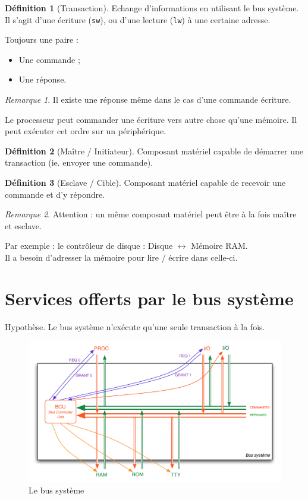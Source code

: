 \documentclass[11pt,english,french]{scrreprt}
\theoremstyle{remark}
\newtheorem*{rem*}{Remarque}
\theoremstyle{definition}
\newtheorem*{def*}{Définition}
\begin{document}
\begin{def*}[Transaction]
	Echange d'informations en utilisant le bus système. Il s'agit d'une écriture (\lstinline!sw!), ou d'une lecture (\lstinline!lw!) à une certaine adresse.
	
	Toujours une paire :\begin{itemize}
		\item Une commande ;
		\item Une réponse.
	\end{itemize}
\end{def*}

\begin{rem*}
	Il existe une réponse même dans le cas d'une commande écriture.
	
	Le processeur peut commander une écriture vers autre chose qu'une mémoire. Il peut exécuter cet ordre sur un périphérique.
\end{rem*}

\begin{def*}[Maître / Initiateur]	
	Composant matériel capable de démarrer une transaction (ie. envoyer une commande).
\end{def*}

\begin{def*}[Esclave / Cible]
	Composant matériel capable de recevoir une commande et d'y répondre.
\end{def*}

\begin{rem*}
	Attention : un même composant matériel peut être à la fois maître et esclave.
	
	Par exemple : le contrôleur de disque : Disque $\longleftrightarrow$ Mémoire RAM.\\
	Il a besoin d'adresser la mémoire pour lire / écrire dans celle-ci.
\end{rem*}


\section{Services offerts par le bus système} %

Hypothèse. Le bus système n'exécute qu'une seule transaction à la fois.

\begin{figure}[!h]
	\center
	\includegraphics[scale=.75]{diagrammes/Bus2}
	\caption{Le bus système}
\end{figure}
\end{document}
